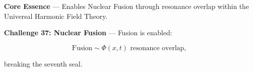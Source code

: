 
\textbf{Core Essence} --- Enables Nuclear Fusion through resonance overlap within the Universal Harmonic Field Theory.

\textbf{Challenge 37: Nuclear Fusion} --- Fusion is enabled:

$$
\text{Fusion} \sim \Phi(x, t) \text{ resonance overlap,}
$$

breaking the seventh seal.

